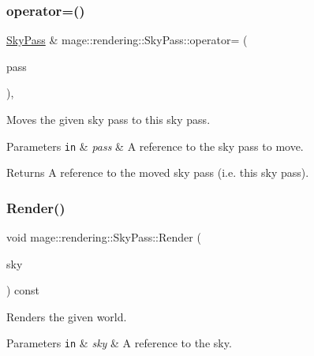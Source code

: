 \subsubsection{\texorpdfstring{operator=()}{operator=()}\hspace{0.1cm}{\footnotesize\ttfamily [2/2]}}
{\footnotesize\ttfamily \hyperlink{classmage_1_1rendering_1_1_sky_pass}{Sky\+Pass} \& mage\+::rendering\+::\+Sky\+Pass\+::operator= (\begin{DoxyParamCaption}\item[{\hyperlink{classmage_1_1rendering_1_1_sky_pass}{Sky\+Pass} \&\&}]{pass }\end{DoxyParamCaption})\hspace{0.3cm}{\ttfamily [default]}, {\ttfamily [noexcept]}}

Moves the given sky pass to this sky pass.


\begin{DoxyParams}[1]{Parameters}
\mbox{\tt in}  & {\em pass} & A reference to the sky pass to move. \\
\hline
\end{DoxyParams}
\begin{DoxyReturn}{Returns}
A reference to the moved sky pass (i.\+e. this sky pass). 
\end{DoxyReturn}
\hypertarget{classmage_1_1rendering_1_1_sky_pass_af0b6421b1c9a638133d6dfe681b1aa78}{}\label{classmage_1_1rendering_1_1_sky_pass_af0b6421b1c9a638133d6dfe681b1aa78} 
\subsubsection{\texorpdfstring{Render()}{Render()}}
{\footnotesize\ttfamily void mage\+::rendering\+::\+Sky\+Pass\+::\+Render (\begin{DoxyParamCaption}\item[{const \hyperlink{classmage_1_1rendering_1_1_sky}{Sky} \&}]{sky }\end{DoxyParamCaption}) const\hspace{0.3cm}{\ttfamily [noexcept]}}

Renders the given world.


\begin{DoxyParams}[1]{Parameters}
\mbox{\tt in}  & {\em sky} & A reference to the sky. \\
\hline
\end{DoxyParams}


